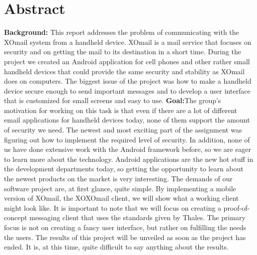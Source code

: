 
\chapter*{Abstract}

\textbf{Background:} This report addresses the problem of communicating with the XOmail system from a handheld device. XOmail is a mail service that focuses on security and on getting the mail to its destination in a short time. During the project we created an Android application for cell phones and other rather small handheld devices that could provide the same security and stability as XOmail does on computers. The biggest issue of the project was how to make a handheld device secure enough to send important messages and to develop a user interface that is customized for small screens and easy to use. 
\newline
\newline
\textbf{Goal:}The group’s motivation for working on this task is that even if there are a lot of different email applications for handheld devices today, none of them support the amount of security we need. The newest and most exciting part of the assignment was figuring out how to implement the required level of security. In addition, none of us have done extensive work with the Android framework before, so we are eager to learn more about the technology. Android applications are the new hot stuff in the development departments today, so getting the opportunity to learn about the newest products on the market is very interesting. 
\newline
\newline
The demands of our software project are, at first glance, quite simple. By implementing a mobile version of XOmail, the XOXOmail client, we will show what a working client might look like. It is important to note that we will focus on creating a proof-of-concept messaging client that uses the standards given by Thales. The primary focus is not on creating a fancy user interface, but rather on fulfilling the needs the users. 
\newline
\newline
The results of this project will be unveiled as soon as the project has ended. It is, at this time, quite difficult to say anything about the results.

